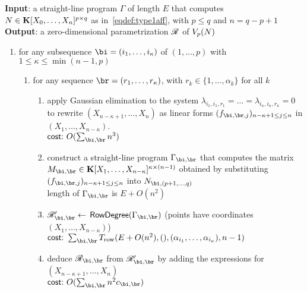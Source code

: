 \documentclass[12pt]{article}
\begin{document}
\begin{algorithm}[!h]
\caption{$\mathsf{RowDegreeDiagonal}(\Gamma)$}
{\bf Input}: a straight-line program $\Gamma$ of length $E$ that computes
 ${N} \in \mathbf{K}[X_0, \ldots, X_n]^{p \times q}$ as in~\eqref{eqdef:type1aff}, with $p \leq q$ and $n = q-p+1$\\
{\bf Output}: a zero-dimensional parametrization $\mathscr{R}$ of $V_p({N})$
\begin{enumerate}
\item for any subsequence $\bi = (i_1, \ldots, i_\kappa)$ of $(1, \ldots, p)$ with $1 \leq \kappa \leq\min(n-1,p)$
  \begin{enumerate}
  \item for any sequence $\br = (r_1, \ldots, r_\kappa)$, with $r_k \in \{1,\dots,\alpha_k\}$ for all $k$
    \begin{enumerate}
    \item apply Gaussian elimination to the system $\lambda_{i_1,i_1,r_1}=\dots=\lambda_{i_\kappa,i_\kappa,r_\kappa}=0$
      to rewrite $(X_{n-\kappa+1}, \ldots, X_n)$ as linear forms $(f_{\bi,\br,j})_{n-\kappa+1 \le j \le n}$ in $(X_1, \ldots, X_{n-\kappa})$. \\
$\text{\sf{cost:~}} O(\sum_{\bi,\br} n^3)$
    \item construct a straight-line program $\Gamma_{\bi,\br}$ that computes the matrix $\mM_{\bi,\br} \in \KK[X_1, \dots, X_{n-\kappa}]^{\kappa \times (n-1)}$ obtained
      by substituting $(f_{\bi,\br,j})_{n-\kappa+1 \le j \le n}$ into $\mN_{\bi,(p+1, \ldots, q)}$ \\
length of $\Gamma_{\bi,\br}$ is $E+O(n^2)$
    \item $\scrR_{\bi,\br}' \gets$ $\mathsf{RowDegree}(\Gamma_{\bi,\br})$  (points have coordinates $(X_1, \ldots, X_{n-\kappa})$)\\
$\text{\sf{cost:~}} \sum_{\bi,\br} T_{\rm row}(E+O(n^2), (), (\alpha_{i_1},\dots,\alpha_{i_\kappa}), n-1)$
    \item\label{step:substdiag} deduce $\scrR_{\bi,\br}$ from $\scrR_{\bi,\br}'$ by adding the expressions for $(X_{n-\kappa+1}, \ldots, X_n)$\\
      $\text{\sf{cost:~}} O(\sum_{\bi,\br} n^2 c_{\bi,\br})$
  \end{enumerate}
  \end{enumerate}


\end{enumerate}
\end{algorithm}
\end{document}
